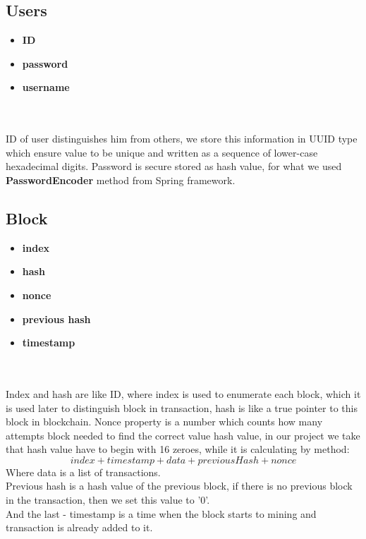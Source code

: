 \documentclass[
	letterpaper, %
	10pt, %
]{CSUniSchoolLabReport}
\begin{document}
\subsection{Users}
\begin{itemize}
    \item \textbf{ID}
	\item \textbf{password}
    \item \textbf{username}
\end{itemize}
\\~\\
ID of user distinguishes him from others, we store this information in UUID type which ensure value to be unique and written as a sequence of lower-case hexadecimal digits. Password is secure stored as hash value, for what we used \textbf{PasswordEncoder} method from Spring framework.

\subsection{Block}
\label{subsec:blockdesc}
\begin{itemize}
    \item \textbf{index}
    \item \textbf{hash}
	\item \textbf{nonce}
    \item \textbf{previous hash}
    \item \textbf{timestamp}
\end{itemize}
\\~\\
Index and hash are like ID, where index is used to enumerate each block, which it is used later to distinguish block in transaction, hash is like a true pointer to this block in blockchain. Nonce property is a number which counts how many attempts block needed to find the correct value hash value, in our project we take that hash value have to begin with 16 zeroes, while it is calculating by method:
\begin{equation}
    index + timestamp + data + previousHash + nonce
\end{equation}
Where data is a list of transactions.
\\ Previous hash is a hash value of the previous block, if there is no previous block in the transaction, then we set this value to '0'.
\\ And the last - timestamp is a time when the block starts to mining and transaction is already added to it.
\end{document}
